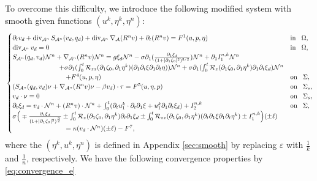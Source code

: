 \documentclass[letterpaper,reqno,10pt,twoside]{amsart}
\theoremstyle{definition}
\theoremstyle{remark}
\def\p{\partial}
\def\dive{\mathop{\rm div}\nolimits}
\begin{document}
	To overcome this difficulty, we introduce the following modified system
	with smooth given functions $(u^{k},\eta^{k},\eta^{n})$:
	\begin{equation}{\label{eq:quasi_linear_{s1}}}
		\begin{cases}
			\partial_{t}v_{d}+\operatorname{div}_{\mathcal{A}^{n}}S_{\mathcal{A}^{n}}(v_{d},q_{d})+\dive_{\mathcal{A}^{n}}\nabla_{\mathcal{A}}(R^{n}v)+\p_{t}(R^{n}v)=F^{1}(u,p,\eta)~~~&\operatorname{in}~~\Omega,\\
			\operatorname{div}_{\mathcal{A}^{n}}v_{d}=0~~~&\operatorname{in}~~\Omega,\\
			S_{\mathcal{A}^{n}}(q_{d},v_{d})\mathcal{N}^{n}+\nabla_{\mathcal{A}^{n}}(R^{n}v)\mathcal{N}^{n}=g\xi_{d}\mathcal{N}^{n}-\sigma\partial_{1}(\frac{\p_1\xi_d}{(1+\vert \partial_{1}\zeta_{0}\vert^{2})^{3/2}})\mathcal{N}^{n}+\p_{1}I_{1}^{n,k}\mathcal{N}^{n}\\
			\quad\quad\quad\quad\quad\quad\quad+\sigma\partial_{1}(\int_{0}^{t}\mathcal{R}_{zz}(\partial_{1}\zeta_{0},\partial_{1}\eta^{k})(\partial_{1}\p_{t}\xi\p_{1}\p_{t}\eta))\mathcal{N}^{n}+\sigma\partial_{1}(\int_{0}^{t}\mathcal{R}_{z}(\partial_{1}\zeta_{0},\partial_{1}\eta^{k})\partial_{1}\partial_{t}\xi_{d})\mathcal{N}^{n}\\
			\quad\quad\quad\quad\quad\quad\quad\quad+F^{4}(u,p,\eta)~~~&\operatorname{on}~~\Sigma,\\
			(S_{\mathcal{A}^{n}}(q_{d},v_{d})\nu+\nabla_{\mathcal{A}^{n}}(R^{n}v)\nu-\beta v_{d})\cdot \tau=F^{5}(u,\eta,p)~~~&\operatorname{on}~~\Sigma_{s},\\
			v_{d}\cdot \nu=0~~~&\operatorname{on}~~\Sigma_{s},\\
			\partial_{t}\xi_{d}=v_{d}\cdot \mathcal{N}^{n}+(R^{n}v)\cdot \mathcal{N}^{n}+\int_{0}^{t}(\partial_{t}u_{1}^{k}\cdot\partial_{t}\p_{1}\xi+u_{1}^{k}\partial_{1}\partial_{t}\xi_{d})+I_{2}^{n,k}~~~&\operatorname{on}~~\Sigma,\\
			\sigma\Big(\mp \frac{\partial_{1}\xi_{d}}{(1+\vert \partial_{1}\zeta_{0}\vert^{2})^{\frac{3}{2}}}\pm \int_{0}^{t}\mathcal{R}_{z}(\partial_{1}\zeta_{0},\partial_{1}\eta^{k})\partial_{t}\partial_{1}\xi_{d}\pm\int_{0}^{t}\mathcal{R}_{zz}(\p_{1}\zeta_{0},\p_{1}\eta^{k})(\p_{t}\p_{1}\xi\p_{1}\p_{t}\eta^{k})\pm I_{1}^{n,k} \Big)(\pm \ell)\\
			\quad\quad\quad\quad\quad\quad\quad\quad=\kappa (v_{d}\cdot \mathcal{N}^{n})(\pm \ell)-{F}^{7},
		\end{cases}
	\end{equation}
	\noindent where the $(\eta^{k},u^{k},\eta^{n})$ is defined in Appendix \ref{sec:smooth} by replacing $\varepsilon$ with $\frac{1}{k}$ and $\frac{1}{n}$, respectively. We have the following convergence properties by \eqref{eq:convergence_e}
\end{document}
